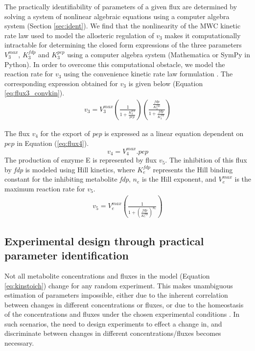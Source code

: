 \documentclass[10pt]{article}
\begin{document}
	The practically identifiability of parameters of a given flux are determined by solving a system of nonlinear algebraic equations using a computer algebra system (Section \ref{sec:ident}). We find that the nonlinearity of the MWC kinetic rate law used to model the allosteric regulation of $v_3$ makes it computationally intractable for determining the closed form expressions of the three parameters $V_3^{max}$, $K_3^{fdp}$ and $K_3^{pep}$ using a computer algebra system (Mathematica or SymPy in Python). In order to overcome this computational obstacle, we model the reaction rate for $v_3$ using the convenience kinetic rate law formulation \parencite{Liebermeister2006}. The corresponding expression obtained for $v_3$ is given below (Equation \ref{eq:flux3_convkin}). 	
	\begin{align}\label{eq:flux3_convkin}
	v_3 = V_3^{max}\left(\frac{1}{1 + \frac{K_3^{pep}}{pep}}\right)\left(\frac{\frac{fdp}{K_3^{fdp}}}{1 + \frac{fdp}{K_3^{fdp}}}\right)
	\end{align}	
	
	The flux $v_4$ for the export of \textit{pep} is expressed as a linear equation dependent on $pep$ in Equation (\ref{eq:flux4}).
	\begin{equation}\label{eq:flux4}
	v_4 = V_{4}^{max}.pep
	\end{equation}		
	The production of enzyme E is represented by flux $v_5$. The inhibition of this flux by \textit{fdp} is modeled using Hill kinetics, where $K_e^{fdp}$ represents the Hill binding constant for the inhibiting metabolite \textit{fdp}, $n_e$ is the Hill exponent, and $V_e^{max}$ is the maximum reaction rate for $v_5$.
	\begin{align}\label{eq:flux5}
	v_5 = V_e^{max}\left(\frac{1}{1+\left(\frac{fdp}{K_{e}^{fdp}}\right)^{n_e}}\right)
	\end{align}
		
	\subsection{Experimental design through practical parameter identification}\label{sec:experimental_design}		
	Not all metabolite concentrations and fluxes in the model (Equation \ref{eq:kinstoich}) change for any random experiment. This makes unambiguous estimation of parameters impossible, either due to the inherent correlation between changes in different concentrations or fluxes, or due to the homeostasis of the concentrations and fluxes under the chosen experimental conditions \parencite{Heijnen2013}. In such scenarios, the need to design experiments to effect a change in, and discriminate between changes in different concentrations/fluxes becomes necessary. 
		
\end{document}
